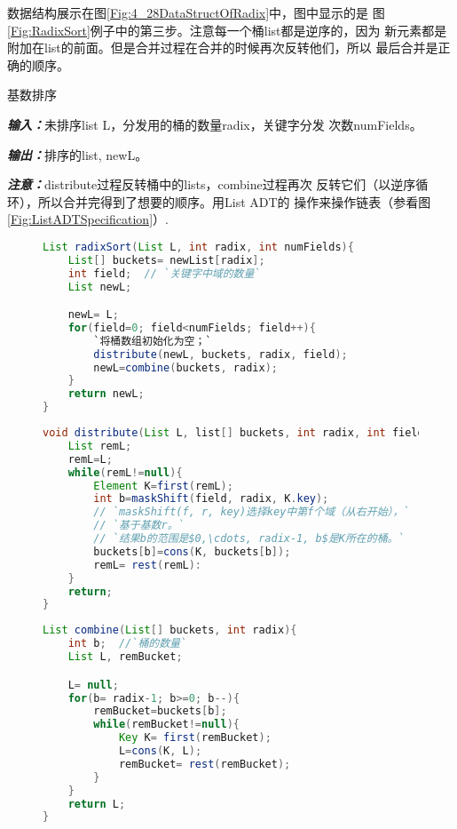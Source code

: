 数据结构展示在图\ref{Fig:4_28DataStructOfRadix}中，图中显示的是
图\ref{Fig:RadixSort}例子中的第三步。注意每一个桶list都是逆序的，因为
新元素都是附加在list的前面。但是合并过程在合并的时候再次反转他们，所以
最后合并是正确的顺序。

\begin{algorithm}
基数排序

{\textbf{\emph{输入：}}}未排序list L，分发用的桶的数量radix，关键字分发
次数numFields。

{\textbf{\emph{输出：}}}排序的list, newL。

{\textbf{\emph{注意：}}}distribute过程反转桶中的lists，combine过程再次
反转它们（以逆序循环），所以合并完得到了想要的顺序。用List ADT的
操作来操作链表（参看图\ref{Fig:ListADTSpecification}）.

\end{algorithm}

\begin{figure}
\begin{lstlisting}[language={Java},keywordstyle=\color{blue!70}, commentstyle=\color{red!50!green!50!blue!50}]
List radixSort(List L, int radix, int numFields){
    List[] buckets= newList[radix];
    int field;  // `关键字中域的数量`
    List newL;

    newL= L;
    for(field=0; field<numFields; field++){
        `将桶数组初始化为空；`
        distribute(newL, buckets, radix, field);
        newL=combine(buckets, radix);
    }
    return newL;
}
\end{lstlisting}
\end{figure}

\begin{figure}
\begin{lstlisting}[language={Java},keywordstyle=\color{blue!70}, commentstyle=\color{red!50!green!50!blue!50}]
void distribute(List L, list[] buckets, int radix, int field){
    List remL;
    remL=L;
    while(remL!=null){
        Element K=first(remL);
        int b=maskShift(field, radix, K.key);
        // `maskShift(f, r, key)选择key中第f个域（从右开始），`
        // `基于基数r。`
        // `结果b的范围是$0,\cdots, radix-1, b$是K所在的桶。`
        buckets[b]=cons(K, buckets[b]);
        remL= rest(remL):
    }
    return;
}
\end{lstlisting}
\end{figure}

\begin{figure}
\begin{lstlisting}[language={Java},keywordstyle=\color{blue!70}, commentstyle=\color{red!50!green!50!blue!50}]
List combine(List[] buckets, int radix){
    int b;  //`桶的数量`
    List L, remBucket;

    L= null;
    for(b= radix-1; b>=0; b--){
        remBucket=buckets[b];
        while(remBucket!=null){
            Key K= first(remBucket);
            L=cons(K, L);
            remBucket= rest(remBucket);
        }
    }
    return L;
}
\end{lstlisting}
\end{figure}

